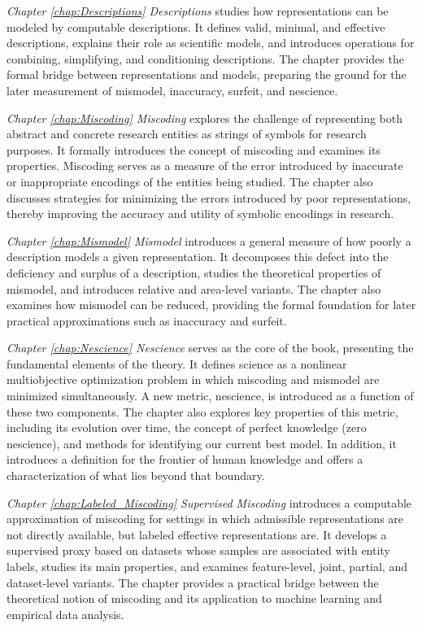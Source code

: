 \emph{Chapter \ref{chap:Descriptions} Descriptions} studies how representations can be modeled by computable descriptions. It defines valid, minimal, and effective descriptions, explains their role as scientific models, and introduces operations for combining, simplifying, and conditioning descriptions. The chapter provides the formal bridge between representations and models, preparing the ground for the later measurement of mismodel, inaccuracy, surfeit, and nescience.

\emph{Chapter \ref{chap:Miscoding} Miscoding} explores the challenge of representing both abstract and concrete research entities as strings of symbols for research purposes. It formally introduces the concept of miscoding and examines its properties. Miscoding serves as a measure of the error introduced by inaccurate or inappropriate encodings of the entities being studied. The chapter also discusses strategies for minimizing the errors introduced by poor representations, thereby improving the accuracy and utility of symbolic encodings in research.

\emph{Chapter \ref{chap:Mismodel} Mismodel} introduces a general measure of how poorly a description models a given representation. It decomposes this defect into the deficiency and surplus of a description, studies the theoretical properties of mismodel, and introduces relative and area-level variants. The chapter also examines how mismodel can be reduced, providing the formal foundation for later practical approximations such as inaccuracy and surfeit.

\emph{Chapter \ref{chap:Nescience} Nescience} serves as the core of the book, presenting the fundamental elements of the theory. It defines science as a nonlinear multiobjective optimization problem in which miscoding and mismodel are minimized simultaneously. A new metric, nescience, is introduced as a function of these two components. The chapter also explores key properties of this metric, including its evolution over time, the concept of perfect knowledge (zero nescience), and methods for identifying our current best model. In addition, it introduces a definition for the frontier of human knowledge and offers a characterization of what lies beyond that boundary.

\emph{Chapter \ref{chap:Labeled_Miscoding} Supervised Miscoding} introduces a computable approximation of miscoding for settings in which admissible representations are not directly available, but labeled effective representations are. It develops a supervised proxy based on datasets whose samples are associated with entity labels, studies its main properties, and examines feature-level, joint, partial, and dataset-level variants. The chapter provides a practical bridge between the theoretical notion of miscoding and its application to machine learning and empirical data analysis.

